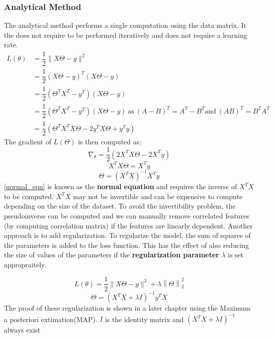 \documentclass[12pt,a4paper,titlepage,landscape]{book}
\begin{document}
	\subsubsection{Analytical Method}
	The analytical method performs a single computation using the data matrix. It the does not require to be performed iteratively and does not require a learning rate.
	\begin{equation*}
		\begin{array}{cl}
		L(\theta) &= \dfrac{1}{2}\|X\Theta - y\|^2 \\
		&= \dfrac{1}{2}(X\Theta - y)^T(X\Theta - y) \\
		&= \dfrac{1}{2}(\Theta^{T}X^T - y^T)(X\Theta - y) \\
		&= \dfrac{1}{2}(\Theta^{T}X^T - y^T)(X\Theta - y) ~ \text{as} ~ (A - B)^T = A^T - B^T \text{and} ~ (AB)^T = B^TA^T \\
		&= \dfrac{1}{2}(\Theta^{T}X^TX\Theta - 2y^TX\Theta + y^Ty)
		\end{array}
	\end{equation*}
	The gradient of $L(\Theta)$ is then computed as;
	\begin{equation*}
		\nabla_\theta = \dfrac{1}{2}\left(2X^TX\Theta - 2X^Ty\right)
	\end{equation*}
	\begin{equation*}
	X^TX\Theta = X^Ty
	\end{equation*}
	\begin{equation}\label{normal_eqn}
	\Theta = \left(X^TX\right)^{-1}X^Ty
	\end{equation}
	\eqref{normal_eqn} is known as the \textbf{normal equation} and requires the inverse of $X^TX$ to be computed. $X^TX$ may not be invertible and can be expensive to compute depending on the size of the dataset. To avoid the invertibility problem, the pseudoinverse can be computed and we can manually remove correlated features (by computing correlation matrix) if the features are linearly dependent. Another approach is to add regularization. To regularize the model, the sum of squares of the parameters is added to the loss function. This has the effect of also reducing the size of values of the parameters if the \textbf{regularization parameter} $\lambda$ is set appropraitely.
	
	
	\begin{equation}
	L(\theta) = \dfrac{1}{2}\|X\Theta - y\|^2 + \lambda\left\|\Theta\right\|_2^2
	\end{equation}
	\begin{equation}
		\Theta = \left(X^TX + \lambda{I}\right)^{-1}y^TX
	\end{equation}
	The proof of these regularization is shown in a later chapter using the Maximum a posteriori extimation(MAP). $I$ is the identity matrix and $\left(X^TX + \lambda{I}\right)^{-1}$ always exist
	
\end{document}
